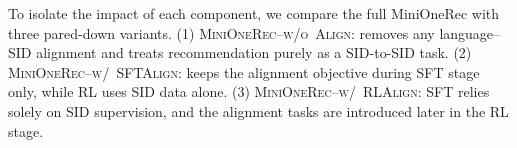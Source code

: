 \begin{table}[]
\caption{Performance of MiniOneRec and its variants on completely unseen recommendation domains} 
\label{tab:ood}
\end{table}

To isolate the impact of each component, we compare the full MiniOneRec with three pared-down variants.  
(1) \textsc{MiniOneRec}--\textsc{w/o~Align}: removes any language–SID alignment and treats recommendation purely as a SID-to-SID task.  
(2) \textsc{MiniOneRec}--\textsc{w/~SFTAlign}: keeps the alignment objective during SFT stage only, while RL uses SID data alone.  
(3) \textsc{MiniOneRec}--\textsc{w/~RLAlign}: SFT relies solely on SID supervision, and the alignment tasks are introduced later in the RL stage.

